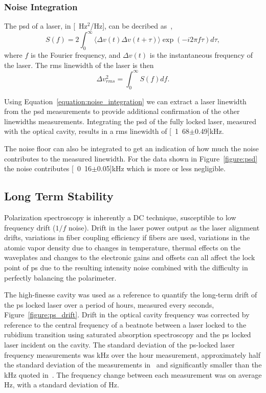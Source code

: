 \subsubsection{Noise Integration}

The \gls{psd} of a laser, in \unit[Hz$^2$/Hz], can be decribed as~\cite{turner_frequency_2002},
\begin{equation}
S(f)=2\int_0^\infty \langle\Delta v(t)\Delta v(t+\tau)\rangle\exp(-i2\pi f \tau)d\tau,
\end{equation}
where $f$ is the Fourier frequency, and $\Delta v (t)$ is the instantaneous frequency of the laser.
The \gls{rms} linewidth of the laser is then
\begin{equation}\label{equation:noise_integration}
\Delta v^2_{rms} = \int_0^\infty S(f) df.
\end{equation}

Using Equation~\ref{equation:noise_integration} we can extract a laser linewidth from the \gls{psd} measurements to provide additional confirmation of the other linewidths measurements.
Integrating the \gls{psd} of the fully locked laser, measured with the optical cavity, results in a \gls{rms} linewidth of \unit[1.68$\pm$0.49]{kHz}.

The noise floor can also be integrated to get an indication of how much the noise contributes to the measured linewidth.
For the data shown in Figure~\ref{figure:psd} the noise contributes \unit[0.16$\pm$0.05]{kHz} which is more or less negligible.

\subsection{Long Term Stability}

Polarization spectroscopy is inherently a DC technique, susceptible to low frequency drift ($1/f$ noise).
Drift in the laser power output as the laser alignment drifts, variations in fiber coupling efficiency if fibers are used, variations in the atomic vapor density due to changes in temperature, thermal effects on the waveplates and changes to the electronic gains and offsets can all affect the lock point of \gls{ps} due to the resulting intensity noise combined with the difficulty in perfectly balancing the polarimeter.

The high-finesse cavity was used as a reference to quantify the long-term drift of the \gls{ps} locked laser over a period of \unit[60]{hours}, measured every \unit[10]{seconds}, Figure~\ref{figure:ps_drift}.
Drift in the optical cavity frequency was corrected by reference to the central frequency of a beatnote between a laser locked to the rubidium transition using saturated absorption spectroscopy and the \gls{ps} locked laser incident on the cavity.
The standard deviation of the \gls{ps}-locked laser frequency measurements was \unit[51]{kHz} over the \unit[60]{hour} measurement, approximately half the standard deviation of the measurements in~\cite{tiwari_laser_2006} and significantly smaller than the \unit[400]{kHz} quoted in~\cite{lee_frequency_2014}.
The frequency change between each measurement was on average \unit[5]{Hz}, with a standard deviation of \unit[210]{Hz}.

